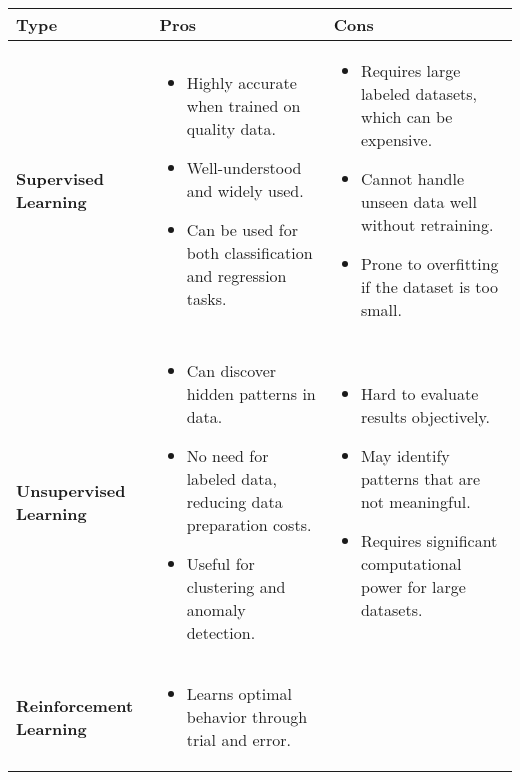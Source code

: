 \begin{table}[h]      
      \begin{tabular}{| m{3.5cm} | m{5cm} | m{5cm} |}
            \hline
            \textbf{Type} & \textbf{Pros} & \textbf{Cons} \\ 
            \hline
            \textbf{Supervised Learning} & 
            \begin{itemize}
                  \item Highly accurate when trained on quality data.
                  \item Well-understood and widely used.
                  \item Can be used for both classification and regression tasks.
            \end{itemize} & 
            \begin{itemize}
                  \item Requires large labeled datasets, which can be expensive.
                  \item Cannot handle unseen data well without retraining.
                  \item Prone to overfitting if the dataset is too small.
            \end{itemize} \\ 
            \hline
            \textbf{Unsupervised Learning} & 
            \begin{itemize}
                  \item Can discover hidden patterns in data.
                  \item No need for labeled data, reducing data preparation costs.
                  \item Useful for clustering and anomaly detection.
            \end{itemize} & 
            \begin{itemize}
                  \item Hard to evaluate results objectively.
                  \item May identify patterns that are not meaningful.
                  \item Requires significant computational power for large datasets.
            \end{itemize} \\ 
            \hline
            \textbf{Reinforcement Learning} & 
            \begin{itemize}
                  \item Learns optimal behavior through trial and error.

\end{itemize}
\end{tabular}
\end{table}
